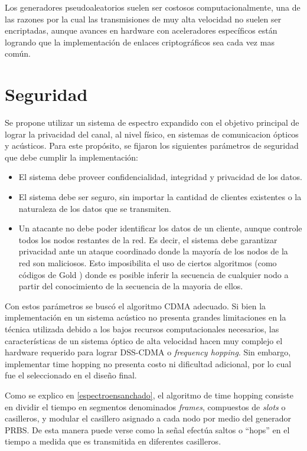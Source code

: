 Los generadores pseudoaleatorios suelen ser costosos computacionalmente, una de las razones por la cual las transmisiones de muy alta velocidad no suelen ser encriptadas, aunque avances en hardware con aceleradores específicos \cite{firasta2008intel} están logrando que la implementación de enlaces criptográficos sea cada vez mas común.

\section{Seguridad}
\label{Seguridad}

Se propone utilizar un sistema de espectro expandido con el objetivo principal de lograr la privacidad del canal, al nivel físico, en sistemas de comunicacion ópticos y acústicos.
Para este propósito, se fijaron los siguientes parámetros de seguridad que debe cumplir la implementación:

\begin{itemize}
 \item El sistema debe proveer confidencialidad, integridad y privacidad de los datos.
 \item El sistema debe ser seguro, sin importar la cantidad de clientes existentes o la naturaleza de los datos que se transmiten.
 \item Un atacante no debe poder identificar los datos de un cliente, aunque controle todos los nodos restantes de la red. Es decir, el sistema debe garantizar privacidad ante un ataque coordinado donde la mayoría de los nodos de la red son maliciosos. Esto imposibilita el uso de ciertos algoritmos (como códigos de Gold \cite{gold1967optimal}) donde es posible inferir la secuencia de cualquier nodo a partir del conocimiento de la secuencia de la mayoria de ellos.
\end{itemize}

Con estos parámetros se buscó el algoritmo CDMA adecuado. Si bien la implementación en un sistema acústico no presenta grandes limitaciones en la técnica utilizada debido a los bajos recursos computacionales necesarios, las características de un sistema óptico de alta velocidad hacen muy complejo el hardware requerido para lograr DSS-CDMA o \textit{frequency hopping}. Sin embargo, implementar time hopping no presenta costo ni dificultad adicional, por lo cual fue el seleccionado en el diseño final.

Como se explico en \ref{espectroensanchado}, el algoritmo de time hopping consiste en dividir el tiempo en segmentos denominados \textit{frames}, compuestos de \textit{slots} o casilleros, y modular el casillero asignado a cada nodo por medio del generador PRBS. De esta manera puede verse como la señal efectúa saltos o ``hops'' en el tiempo a medida que es transmitida en diferentes casilleros.


